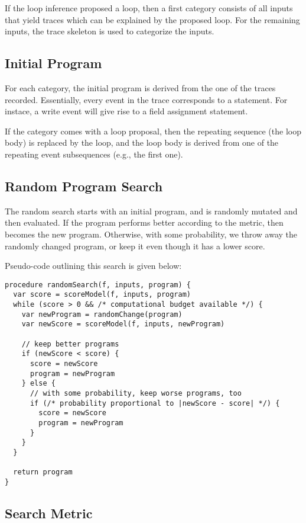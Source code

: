 \documentclass[]{article}
\begin{document}
If the loop inference proposed a loop, then a first category consists of
all inputs that yield traces which can be explained by the proposed loop.
For the remaining inputs, the trace skeleton is used to categorize
the inputs.

\subsection{Initial Program}

For each category, the initial program is derived from the one of the traces
recorded.
Essentially, every event in the trace corresponds to a statement.  For instace,
a write event will give rise to a field assignment statement.

If the category comes with a loop proposal, then the repeating sequence
(the loop body) is replaced by the loop, and the loop body is derived from
one of the repeating event subsequences (e.g., the first one).


\subsection{Random Program Search}

The random search starts with an initial program, and is randomly mutated
and then evaluated.  If the program performs better according to the
metric, then becomes the new program.  Otherwise, with some probability,
we throw away the randomly changed program, or keep it even though it
has a lower score.

Pseudo-code outlining this search is given below:

\begin{verbatim}
procedure randomSearch(f, inputs, program) {
  var score = scoreModel(f, inputs, program)
  while (score > 0 && /* computational budget available */) {
    var newProgram = randomChange(program)
    var newScore = scoreModel(f, inputs, newProgram)
    
    // keep better programs
    if (newScore < score) {
      score = newScore
      program = newProgram
    } else {
      // with some probability, keep worse programs, too
      if (/* probability proportional to |newScore - score| */) {
        score = newScore
        program = newProgram
      }
    }
  }
  
  return program
}
\end{verbatim}



\subsection{Search Metric}
\end{document}
